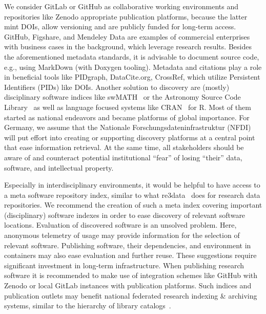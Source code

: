 \documentclass[a4paper,num-refs,numbers,sort&compress]{de-rse}
\begin{document}
We consider GitLab or GitHub as collaborative working environments and repositories like Zenodo appropriate publication platforms, because the latter mint DOIs, allow versioning and are publicly funded for long-term access. GitHub, Figshare, and Mendeley Data are examples of commercial enterprises with business cases in the background, which leverage research results. Besides the aforementioned metadata standards, it is advisable to document source code, e.g., using MarkDown (with Doxygen tooling). Metadata and citations play a role in beneficial tools like PIDgraph, DataCite.org, CrossRef, which utilize Persistent Identifiers (PIDs) like DOIs.
Another solution to discovery are (mostly) disciplinary software indices like swMATH~\cite{swMATH} or the Astronomy Source Code Library~\cite{ASCLnet} as well as language focused systems like CRAN~\cite{CRAN} for \textsf{R}. Most of them started as national endeavors and became platforms of global importance. For Germany, we assume that the Nationale Forschungsdateninfrastruktur (NFDI) will put effort into creating or supporting discovery platforms at a central point that ease information retrieval. At the same time, all stakeholders should be aware of and counteract potential institutional ``fear'' of losing ``their'' data, software, and intellectual property.

Especially in interdisciplinary environments, it would be helpful to have access to a meta software repository index, similar to what re3data~\cite{re3data} does for research data repositories. We recommend the creation of such a meta index covering important (disciplinary) software indexes in order to ease discovery of relevant software locations. Evaluation of discovered software is an unsolved problem. Here, anonymous telemetry of usage may provide information for the selection of relevant software. Publishing software, their dependencies, and environment in containers may also ease evaluation and further reuse. These suggestions require significant investment in long-term infrastructure.
When publishing research software it is recommended to make use of integration schemes like GitHub with Zenodo or local GitLab instances with publication platforms.
Such indices and publication outlets may benefit national federated research indexing \& archiving systems, similar to the hierarchy of library catalogs~\cite{KVK}.
\end{document}
